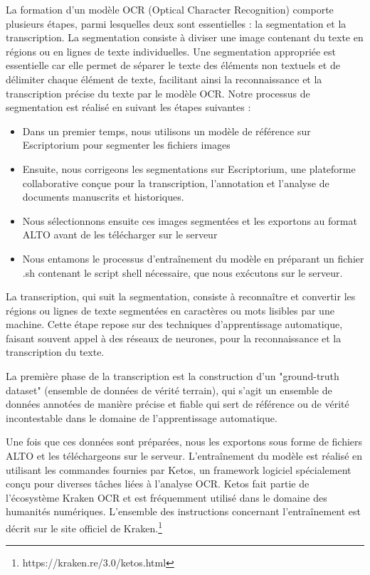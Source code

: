 La formation d'un modèle OCR (Optical Character Recognition) comporte plusieurs étapes, parmi lesquelles deux sont essentielles : la segmentation et la transcription. La segmentation consiste à diviser une image contenant du texte en régions ou en lignes de texte individuelles. Une segmentation appropriée est essentielle car elle permet de séparer le texte des éléments non textuels et de délimiter chaque élément de texte, facilitant ainsi la reconnaissance et la transcription précise du texte par le modèle OCR. Notre processus de segmentation est réalisé en suivant les étapes suivantes :
\begin{itemize}
    \item Dans un premier temps, nous utilisons un modèle de référence sur Escriptorium pour segmenter les fichiers images
    \item Ensuite, nous corrigeons les segmentations sur Escriptorium, une plateforme collaborative conçue pour la transcription, l'annotation et l'analyse de documents manuscrits et historiques.
    \item Nous sélectionnons ensuite ces images segmentées et les exportons au format ALTO avant de les télécharger sur le serveur 
    \item Nous entamons le processus d'entraînement du modèle en préparant un fichier .sh contenant le script shell nécessaire, que nous exécutons sur le serveur.
\end{itemize}

La transcription, qui suit la segmentation, consiste à reconnaître et convertir les régions ou lignes de texte segmentées en caractères ou mots lisibles par une machine. Cette étape repose sur des techniques d'apprentissage automatique, faisant souvent appel à des réseaux de neurones, pour la reconnaissance et la transcription du texte.

La première phase de la transcription est la construction d'un "ground-truth dataset" (ensemble de données de vérité terrain), qui s'agit un ensemble de données annotées de manière précise et fiable qui sert de référence ou de vérité incontestable dans le domaine de l'apprentissage automatique.

Une fois que ces données sont préparées, nous les exportons sous forme de fichiers ALTO et les téléchargeons sur le serveur. L'entraînement du modèle est réalisé en utilisant les commandes fournies par Ketos, un framework logiciel spécialement conçu pour diverses tâches liées à l'analyse OCR. Ketos fait partie de l'écosystème Kraken OCR et est fréquemment utilisé dans le domaine des humanités numériques. L'ensemble des instructions concernant l'entraînement est décrit sur le site officiel de Kraken.\footnote{https://kraken.re/3.0/ketos.html}


